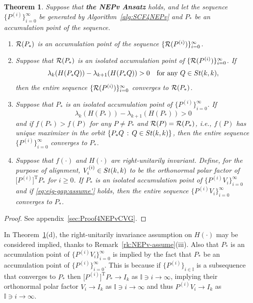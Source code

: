 \documentclass[11pt]{article}
\def\bbI{\mathbb{I}}
\def\cR{{\cal R}}
\newcommand\STM[2]{{\rm St}(#1,#2)}
\DeclareMathOperator{\T}{T}
\newtheorem{theorem}{Theorem}[section]
\theoremstyle{definition}
\numberwithin{equation}{section}
\begin{document}
\begin{theorem}\label{thm:cvg4SCF4NEPv'}
Suppose that {\bf the NEPv Ansatz} holds, and let the sequence $\{P^{(i)}\}_{i=0}^{\infty}$ be generated by Algorithm~\ref{alg:SCF4NEPv} and $P_*$ be an accumulation
point of the sequence.
\begin{enumerate}[{\rm (a)}]
  \item $\cR(P_*)$ is an accumulation point of the sequence $\{\cR(P^{(i)})\}_{i=0}^{\infty}$.
  \item Suppose that $\cR(P_*)$ is an isolated accumulation point of $\{\cR(P^{(i)})\}_{i=0}^{\infty}$. If
        \begin{equation}\label{eq:eig-gap:assume}
        \lambda_k(H(P_*Q))-\lambda_{k+1}(H(P_*Q))>0\quad\mbox{for any $Q\in\STM{k}{k}$},
        \end{equation}
        then
        the entire sequence $\{\cR(P^{(i)})\}_{i=0}^{\infty}$ converges to $\cR(P_*)$.
  \item Suppose that $P_*$ is an isolated accumulation point of $\{P^{(i)}\}_{i=0}^{\infty}$. If
        \begin{equation}\label{eq:eig-gap:assume'}
        \lambda_k(H(P_*))-\lambda_{k+1}(H(P_*))>0
        \end{equation}
        and if
        $f(P_*)>f(P)$ for any $P\ne P_*$ and $\cR(P)=\cR(P_*)$,
        i.e.,
        $f(P)$ has unique maximizer in the orbit $\{P_*Q\,:\,Q\in\STM{k}{k}\}$,
        then
        the entire sequence $\{P^{(i)}\}_{i=0}^{\infty}$ converges to $P_*$.
  \item Suppose that $f(\cdot)$ and $H(\cdot)$ are right-unitarily invariant. Define, for the purpose of alignment,
        $V_i^{(i)}\in\STM{k}{k}$ to be the orthonormal polar
factor of $\big[P^{(i)}\big]^{\T}P_*$ for $i\ge 0$.
  If
        $P_*$ is an isolated accumulation point of $\{P^{(i)}V_i\}_{i=0}^{\infty}$
        and if \eqref{eq:eig-gap:assume'} holds, then
        the entire sequence $\{P^{(i)}V_i\}_{i=0}^{\infty}$ converges to $P_*$.
\end{enumerate}
\end{theorem}

\begin{proof}
See appendix~\ref{sec:Proof4NEPvCVG}.
\end{proof}

In Theorem~\ref{thm:cvg4SCF4NEPv'}(d), the right-unitarily invariance assumption on $H(\cdot)$
may be considered implied, thanks to Remark~\ref{rk:NEPv-assume}(iii).
Also that $P_*$ is an accumulation point of $\{P^{(i)}V_i\}_{i=0}^{\infty}$ is implied by the fact that $P_*$ be an accumulation
point of $\{P^{(i)}\}_{i=0}^{\infty}$. This is because if $\{P^{(i)}\}_{i\in\bbI}$ is a subsequence that converges
to $P_*$ then $\big[P^{(i)}\big]^{\T}P_*\to I_k$ as $\bbI\ni i\to\infty$, implying their orthonormal polar factor
$V_i\to I_k$ as $\bbI\ni i\to\infty$ \cite{li:1995} and thus $P^{(i)}V_i\to I_k$ as $\bbI\ni i\to\infty$.
\end{document}
